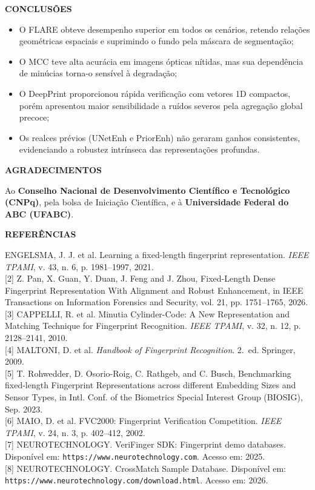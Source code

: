 \documentclass[12pt]{article}
\newcommand{\postersection}[1]{%
  {\noindent\fontsize{36pt}{41pt}\selectfont\textbf{#1}}\par%
  \vspace{0.18cm}%
}
\begin{document}
\begin{minipage}[t][89.8cm][s]{42.8cm}
  \vfill
  \postersection{CONCLUSÕES}
  \begin{itemize}[leftmargin=1.1cm, itemsep=0.12cm, topsep=0.12cm, parsep=0pt]
    \item O FLARE obteve desempenho superior em todos os cenários, retendo relações geométricas espaciais e suprimindo o fundo pela máscara de segmentação;
    \item O MCC teve alta acurácia em imagens ópticas nítidas, mas sua dependência de minúcias torna-o sensível à degradação;
    \item O DeepPrint proporcionou rápida verificação com vetores 1D compactos, porém apresentou maior sensibilidade a ruídos severos pela agregação global precoce;
    \item Os realces prévios (UNetEnh e PriorEnh) não geraram ganhos consistentes, evidenciando a robustez intrínseca das representações profundas.
  \end{itemize}

  \vfill
  \postersection{AGRADECIMENTOS}
  Ao \textbf{Conselho Nacional de Desenvolvimento Científico e Tecnológico (CNPq)}, pela bolsa de Iniciação Científica, e à \textbf{Universidade Federal do ABC (UFABC)}.

  \vfill
  \postersection{REFERÊNCIAS}
  \fontsize{24pt}{28pt}\selectfont
  \noindent
  [1] ENGELSMA, J. J. et al. Learning a fixed-length fingerprint representation. \textit{IEEE TPAMI}, v. 43, n. 6, p. 1981--1997, 2021.\\[0.06cm]
  [2] Z. Pan, X. Guan, Y. Duan, J. Feng and J. Zhou, Fixed-Length Dense Fingerprint Representation With Alignment and Robust Enhancement, in IEEE Transactions on Information Forensics and Security, vol. 21, pp. 1751--1765, 2026.\\[0.06cm]
  [3] CAPPELLI, R. et al. Minutia Cylinder-Code: A New Representation and Matching Technique for Fingerprint Recognition. \textit{IEEE TPAMI}, v. 32, n. 12, p. 2128--2141, 2010.\\[0.06cm]
  [4] MALTONI, D. et al. \textit{Handbook of Fingerprint Recognition}. 2.~ed. Springer, 2009.\\[0.06cm]
  [5] T. Rohwedder, D. Osorio-Roig, C. Rathgeb, and C. Busch, Benchmarking fixed-length Fingerprint Representations across different Embedding Sizes and Sensor Types, in Intl. Conf. of the Biometrics Special Interest Group (BIOSIG), Sep. 2023.\\[0.06cm]
  [6] MAIO, D. et al. FVC2000: Fingerprint Verification Competition. \textit{IEEE TPAMI}, v. 24, n. 3, p. 402--412, 2002.\\[0.06cm]
  [7] NEUROTECHNOLOGY. VeriFinger SDK: Fingerprint demo databases. Disponível em: \texttt{https://www.neurotechnology.com}. Acesso em: 2025.\\[0.06cm]
  [8] NEUROTECHNOLOGY. CrossMatch Sample Database. Disponível em: \texttt{https://www.neurotechnology.com/download.html}. Acesso em: 2026.

\end{minipage}
\end{document}
